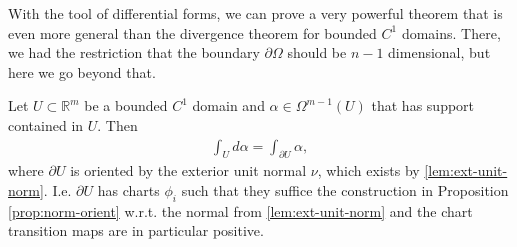 With the tool of differential forms, we can prove a very powerful theorem that is even more general than the divergence theorem for bounded $C^{1}$ domains. There, we had the restriction that the boundary $\partial \Omega$ should be $n-1$ dimensional, but here we go beyond that.

\begin{theorem}\label{thm:div-thm-diffforms}
	Let $U \subset \mathbb{R}^{m}$ be a bounded $C^{1}$ domain and $\alpha \in \Omega^{m-1}(U)$ that has support contained in $U$. Then
	\begin{align*}
		\int_{U} d \alpha  = \int_{\partial U} \alpha,
	\end{align*}
	where $\partial U$ is oriented by the exterior unit normal $\nu$, which exists by \ref{lem:ext-unit-norm}. I.e. $\partial U$ has charts $\phi_{i}$ such that they suffice the construction in Proposition \ref{prop:norm-orient} w.r.t. the normal from \ref{lem:ext-unit-norm} and the chart transition maps are in particular positive.
\end{theorem}
